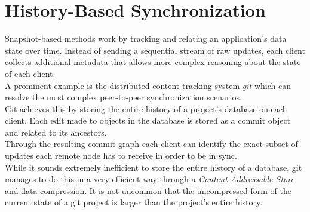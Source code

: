 \section{History-Based Synchronization}
\label{sec:background.history-based}
Snapshot-based methods work by tracking and relating an application's data state over time.
Instead of sending a sequential stream of raw updates, each client collects additional metadata that allows more complex reasoning about the state of each client.\\
A prominent example is the distributed content tracking system \emph{git} \cite{git} which can resolve the most complex peer-to-peer synchronization scenarios.\\
Git achieves this by storing the entire history of a project's database on each client.
Each edit made to objects in the database is stored as a commit object and related to its ancestors.\\
Through the resulting commit graph each client can identify the exact subset of updates each remote node has to receive in order to be in sync.\\
While it sounds extremely inefficient to store the entire history of a database, git manages to do this in a very efficient way through a \emph{Content Addressable Store} and data compression.
It is not uncommon that the uncompressed form of the current state of a git project is larger than the project's entire history.

